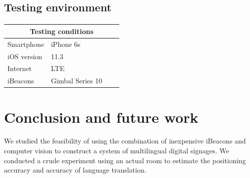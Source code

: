 \documentclass[12pt]{article}
\begin{document}
%
%
%
%
%


\subsection{Testing environment}
\paragraph{}

\begin{tabular}{ |p{6cm}||p{6cm}|p{3cm}|p{3cm}|  }
 \hline
 \multicolumn{4}{|c|}{Testing conditions} \\
 \hline
 Smartphone   & iPhone 6s  \\
  iOS version &11.3 \\
 Internet &   LTE \\
  iBeacons &   Gimbal  Series 10 \\
 
 \hline
\end{tabular}

\section{ Conclusion and future work}
\label{sect-conclusion}
\paragraph{}We studied the feasibility of using the combination of inexpensive iBeacons and computer vision to construct a system of multilingual digital signages. We conducted a crude experiment using an actual room to estimate the positioning accuracy and accuracy of language translation. 
\end{document}
